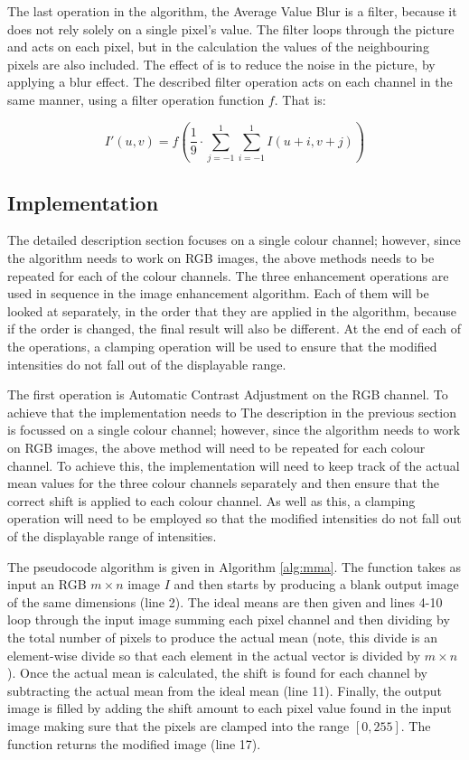 \documentclass[journal,transmag]{IEEEtran}
\begin{document}
The last operation in the algorithm, the Average Value Blur is a filter, because it does not rely solely on a single pixel's value. The filter loops through the picture and acts on each pixel, but in the calculation the values of the neighbouring pixels are also included. The effect of is to reduce the noise in the picture, by applying a blur effect.\cite{averageFilter} The described filter operation acts on each channel in the same manner, using a filter operation function $f$. That is: 

\begin{equation} %
I'(u, v) = f(\frac{1}{9}\cdot\sum_{j=-1}^{1}\sum_{i=-1}^{1}I(u+i, v+j))
\end{equation}

\subsection{Implementation}
The detailed description section focuses on a single colour channel; however, since the algorithm needs to work on RGB images, the above methods needs to be repeated for each of the colour channels. The three enhancement operations are used in sequence in the image enhancement algorithm. Each of them will be looked at separately, in the order that they are applied in the algorithm, because if the order is changed, the final result will also be different. At the end of each of the operations, a clamping operation will be used to ensure that the modified intensities do not fall out of the displayable range.

The first operation is Automatic Contrast Adjustment on the RGB channel. To achieve that the implementation needs to %
The description in the previous section is focussed on a single colour channel; however, since the algorithm needs to work on RGB images, the above method will need to be repeated for each colour channel.  To achieve this, the implementation will need to keep track of the actual mean values for the three colour channels separately and then ensure that the correct shift is applied to each colour channel.  As well as this, a clamping operation will need to be employed so that the modified intensities do not fall out of the displayable range of intensities.

The pseudocode algorithm is given in Algorithm \ref{alg:mma}.  The function takes as input an RGB $m \times n$ image $I$ and then starts by producing a blank output image of the same dimensions (line 2).  The ideal means are then given and lines 4-10 loop through the input image summing each pixel channel and then dividing by the total number of pixels to produce the actual mean (note, this divide is an element-wise divide so that each element in the actual vector is divided by $m \times n$).   Once the actual mean is calculated, the shift is found for each channel by subtracting the actual mean from the ideal mean (line 11).  Finally, the output image is filled by adding the shift amount to each pixel value found in the input image making sure that the pixels are clamped into the range $[0,255]$.  The function returns the modified image (line 17).
\end{document}
